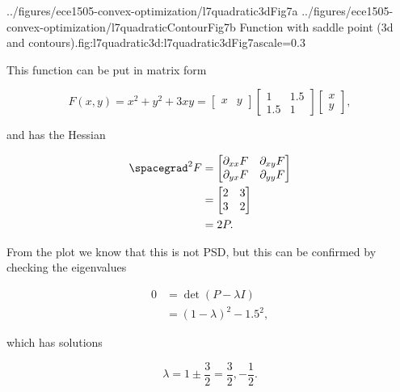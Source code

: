 \imageTwoFigures
{../figures/ece1505-convex-optimization/l7quadratic3dFig7a}
{../figures/ece1505-convex-optimization/l7quadraticContourFig7b}
{Function with saddle point (3d and contours).}{fig:l7quadratic3d:l7quadratic3dFig7a}{scale=0.3}

This function can be put in matrix form

\begin{dmath}\label{eqn:convexOptimizationLecture7:160}
F(x, y) = x^2 + y^2 + 3 x y
=
\begin{bmatrix}
x & y
\end{bmatrix}
\begin{bmatrix}
1 & 1.5 \\
1.5 & 1
\end{bmatrix}
\begin{bmatrix}
x \\
 y
\end{bmatrix},
\end{dmath}

and has the Hessian

\begin{dmath}\label{eqn:convexOptimizationLecture7:180}
\begin{aligned}
\spacegrad^2 F
&=
\begin{bmatrix}
\partial_{xx} F & \partial_{xy} F \\
\partial_{yx} F & \partial_{yy} F \\
\end{bmatrix} \\
&=
\begin{bmatrix}
2 & 3 \\
3 & 2
\end{bmatrix} \\
&= 2 P.
\end{aligned}
\end{dmath}

From the plot we know that this is not PSD, but this can be confirmed by checking the eigenvalues

\begin{dmath}\label{eqn:convexOptimizationLecture7:200}
\begin{aligned}
0 
&=
\det ( P - \lambda I ) \\
&=
(1 - \lambda)^2 - 1.5^2,
\end{aligned}
\end{dmath}

which has solutions

\begin{dmath}\label{eqn:convexOptimizationLecture7:220}
\lambda = 1 \pm \frac{3}{2} = \frac{3}{2}, -\frac{1}{2}.
\end{dmath}

